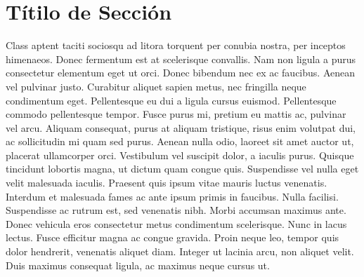 \section{Títilo de Sección} 
Class aptent taciti sociosqu ad litora torquent per
conubia nostra, per inceptos himenaeos. Donec fermentum est at scelerisque
convallis. Nam non ligula a purus consectetur elementum eget ut orci. Donec
bibendum nec ex ac faucibus. Aenean vel pulvinar justo. Curabitur aliquet sapien
metus, nec fringilla neque condimentum eget. Pellentesque eu dui a ligula cursus
euismod. Pellentesque commodo pellentesque tempor. Fusce purus mi, pretium eu
mattis ac, pulvinar vel arcu. Aliquam consequat, purus at aliquam tristique,
risus enim volutpat dui, ac sollicitudin mi quam sed purus. Aenean nulla odio,
laoreet sit amet auctor ut, placerat ullamcorper orci. Vestibulum vel suscipit
dolor, a iaculis purus. Quisque tincidunt lobortis magna, ut dictum quam congue
quis. Suspendisse vel nulla eget velit malesuada iaculis. Praesent quis ipsum
vitae mauris luctus venenatis. Interdum et malesuada fames ac ante ipsum primis
in faucibus. Nulla facilisi. Suspendisse ac rutrum est, sed venenatis nibh.
Morbi accumsan maximus ante. Donec vehicula eros consectetur metus condimentum
scelerisque. Nunc in lacus lectus. Fusce efficitur magna ac congue gravida.
Proin neque leo, tempor quis dolor hendrerit, venenatis aliquet diam. Integer ut
lacinia arcu, non aliquet velit. Duis maximus consequat ligula, ac maximus neque
cursus ut.